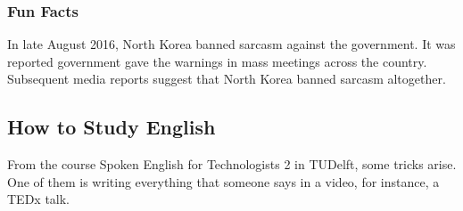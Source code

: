 \subsubsection{Fun Facts}
In late August 2016, North Korea banned sarcasm against the government. It was reported government gave the warnings in mass meetings across the country. Subsequent media reports suggest that North Korea banned sarcasm altogether.



\subsection{How to Study English}
From the course Spoken English for Technologists 2 in TUDelft, some tricks arise.
One of them is writing everything that someone says in a video, for instance, a TEDx talk.





